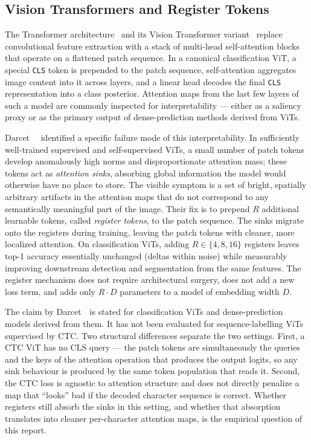 \subsection{Vision Transformers and Register Tokens}
\label{sec:rw_registers}

The Transformer architecture~\cite{vaswani2017attention} and its Vision Transformer variant~\cite{dosovitskiy2021vit} replace convolutional feature extraction with a stack of multi-head self-attention blocks that operate on a flattened patch sequence. In a canonical classification ViT, a special \texttt{CLS} token is prepended to the patch sequence, self-attention aggregates image content into it across layers, and a linear head decodes the final \texttt{CLS} representation into a class posterior. Attention maps from the last few layers of such a model are commonly inspected for interpretability --- either as a saliency proxy or as the primary output of dense-prediction methods derived from ViTs.

Darcet~\etal~\cite{darcet2024registers} identified a specific failure mode of this interpretability. In sufficiently well-trained supervised and self-supervised ViTs, a small number of patch tokens develop anomalously high norms and disproportionate attention mass; these tokens act as \emph{attention sinks}, absorbing global information the model would otherwise have no place to store. The visible symptom is a set of bright, spatially arbitrary artifacts in the attention maps that do not correspond to any semantically meaningful part of the image. Their fix is to prepend $R$ additional learnable tokens, called \emph{register tokens}, to the patch sequence. The sinks migrate onto the registers during training, leaving the patch tokens with cleaner, more localized attention. On classification ViTs, adding $R \in \{4, 8, 16\}$ registers leaves top-1 accuracy essentially unchanged (deltas within noise) while measurably improving downstream detection and segmentation from the same features. The register mechanism does not require architectural surgery, does not add a new loss term, and adds only $R \cdot D$ parameters to a model of embedding width $D$.

The claim by Darcet~\etal\ is stated for classification ViTs and dense-prediction models derived from them. It has not been evaluated for sequence-labelling ViTs supervised by CTC. Two structural differences separate the two settings. First, a CTC ViT has no CLS query --- the patch tokens are simultaneously the queries and the keys of the attention operation that produces the output logits, so any sink behaviour is produced by the same token population that reads it. Second, the CTC loss is agnostic to attention structure and does not directly penalize a map that ``looks'' bad if the decoded character sequence is correct. Whether registers still absorb the sinks in this setting, and whether that absorption translates into cleaner per-character attention maps, is the empirical question of this report.

